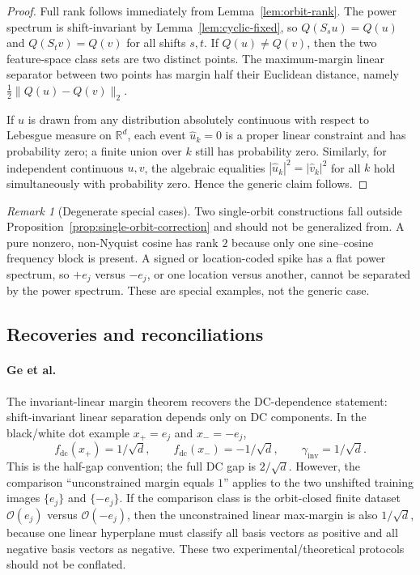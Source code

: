 \documentclass[11pt]{article}
\theoremstyle{plain}
\theoremstyle{definition}
\theoremstyle{remark}
\newtheorem{remark}{Remark}
\newcommand{\R}{\mathbb{R}}
\newcommand{\fdc}{f_{\mathrm{dc}}}
\newcommand{\Orb}{\mathcal O}
\begin{document}
\begin{proof}
Full rank follows immediately from Lemma~\ref{lem:orbit-rank}.  The power spectrum is shift-invariant by Lemma~\ref{lem:cyclic-fixed}, so $Q(S_su)=Q(u)$ and $Q(S_tv)=Q(v)$ for all shifts $s,t$.  If $Q(u)\ne Q(v)$, then the two feature-space class sets are two distinct points.  The maximum-margin linear separator between two points has margin half their Euclidean distance, namely $\frac12\|Q(u)-Q(v)\|_2$.

If $u$ is drawn from any distribution absolutely continuous with respect to Lebesgue measure on $\R^d$, each event $\hat u_k=0$ is a proper linear constraint and has probability zero; a finite union over $k$ still has probability zero.  Similarly, for independent continuous $u,v$, the algebraic equalities $|\hat u_k|^2=|\hat v_k|^2$ for all $k$ hold simultaneously with probability zero.  Hence the generic claim follows.
\end{proof}

\begin{remark}[Degenerate special cases]
Two single-orbit constructions fall outside Proposition~\ref{prop:single-orbit-correction} and should not be generalized from.  A pure nonzero, non-Nyquist cosine has rank $2$ because only one sine--cosine frequency block is present.  A signed or location-coded spike has a flat power spectrum, so $+e_j$ versus $-e_j$, or one location versus another, cannot be separated by the power spectrum.  These are special examples, not the generic case.
\end{remark}

\subsection{Recoveries and reconciliations}\label{sec:recoveries}

\paragraph{Ge et al.}
The invariant-linear margin theorem recovers the DC-dependence statement: shift-invariant linear separation depends only on DC components.  In the black/white dot example $x_+=e_j$ and $x_-=-e_j$,
\[
\fdc(x_+)=1/\sqrt d,
\qquad
\fdc(x_-)=-1/\sqrt d,
\qquad
\gamma_{\mathrm{inv}}=1/\sqrt d.
\]
This is the half-gap convention; the full DC gap is $2/\sqrt d$.  However, the comparison ``unconstrained margin equals $1$'' applies to the two unshifted training images $\{e_j\}$ and $\{-e_j\}$.  If the comparison class is the orbit-closed finite dataset $\Orb(e_j)$ versus $\Orb(-e_j)$, then the unconstrained linear max-margin is also $1/\sqrt d$, because one linear hyperplane must classify all basis vectors as positive and all negative basis vectors as negative.  These two experimental/theoretical protocols should not be conflated.
\end{document}
